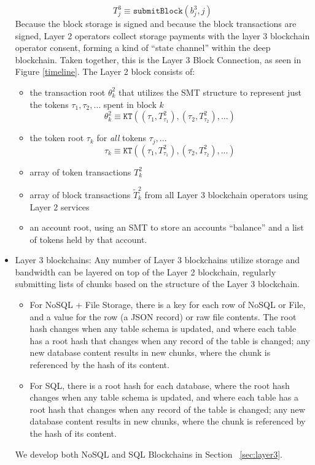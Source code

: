 \documentclass{article}
\newcommand{\blockhash}[2]{b^{#1}_{#2}}
\newcommand{\transaction}[2]{T_{#2}^#1}
\newcommand{\blocktransaction}[2]{\tilde{T}_{#2}^#1}
\newcommand{\transactionroot}[2]{\theta_{#2}^#1}
\newcommand{\tokenroot}[1]{\tau_{#1}}
\newcommand{\submitblock}[2]{\texttt{submitBlock}(#2, #1)}
\begin{document}
\begin{itemize}
\begin{equation}
\transaction{3}{j} \equiv \submitblock{j}{\blockhash{3}{j}}
\end{equation}
Because the block storage is signed and because the block transactions are signed, Layer 2 operators  collect storage payments with the layer 3 blockchain operator consent, forming a kind of ``state channel'' within the deep blockchain.  Taken together, this is the Layer 3 Block Connection, as seen in Figure \ref{timeline}.  The Layer 2 block consists of:
\begin{itemize}
\item the transaction root $\transactionroot{2}{k}$ that utilizes the SMT structure to represent just the tokens $\tau_1, \tau_2, \ldots$ spent in block $k$
\begin{equation}
\transactionroot{2}{k} \equiv \texttt{KT}( (\tau_1, \transaction{2}{\tau_1}), (\tau_2, \transaction{2}{\tau_2}), ... )
\end{equation}
\item the token root $\tokenroot{k}$  for {\em all} tokens $\tau_j, ...$
\begin{equation}
\tokenroot{k} \equiv \texttt{KT}( (\tau_1, \transaction{2}{\tau_1}), (\tau_2, \transaction{2}{\tau_2}), ... )
\end{equation}
\item array of token transactions  $\transaction{2}{k}$
\item array of block transactions  $\blocktransaction{2}{k}$ from all Layer 3 blockchain operators using Layer 2 services
\item an account root, using an SMT to store an accounts ``balance'' and a list of tokens held by that account.
\end{itemize}

\item Layer 3 blockchains:  Any number of Layer 3 blockchains utilize storage and bandwidth can be layered on top of the Layer 2 blockchain, regularly submitting lists of chunks based on the structure of the Layer 3 blockchain.
\begin{itemize}
    \item For NoSQL + File Storage, there is a key for each row of NoSQL or File, and a value for the row (a JSON record) or raw file contents.   The root hash changes when any table schema is updated, and where each table has a root hash that changes when any record of the table is changed; any new database content results in new chunks, where the chunk is referenced by the hash of its content.
    \item For SQL, there is a root hash for each database, where the root hash changes when any table schema is updated, and where each table has a root hash that changes when any record of the table is changed; any new database content results in new chunks, where the chunk is referenced by the hash of its content.
\end{itemize}
We develop both NoSQL and SQL Blockchains in Section ~\ref{sec:layer3}.
\end{itemize}
\end{document}
